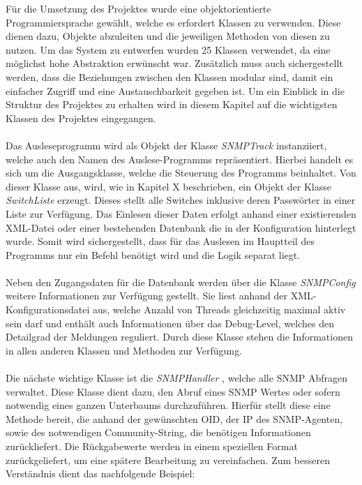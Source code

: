 Für die Umsetzung des Projektes wurde eine objektorientierte Programmiersprache gewählt, welche es erfordert Klassen zu verwenden.
Diese dienen dazu, Objekte abzuleiten und die jeweiligen Methoden von diesen zu nutzen.
Um das System zu entwerfen wurden 25 Klassen verwendet, da eine möglichst hohe Abstraktion erwünscht war.
Zusätzlich muss auch sichergestellt werden, dass die Beziehungen zwischen den Klassen modular sind, damit ein einfacher Zugriff und eine Austauschbarkeit gegeben ist.
Um ein Einblick in die Struktur des Projektes zu erhalten wird in diesem Kapitel auf die wichtigsten Klassen des Projektes eingegangen. \\\\
Das Ausleseprogramm wird als Objekt der Klasse \textit{SNMPTrack} instanziiert, welche auch den Namen des Auslese-Programms repräsentiert.
Hierbei handelt es sich um die Ausgangsklasse, welche die Steuerung des Programms beinhaltet. Von dieser Klasse aus, wird, wie in Kapitel X beschrieben, ein Objekt der Klasse \textit{SwitchListe} erzeugt.
Dieses stellt alle Switches inklusive deren Passwörter in einer Liste zur Verfügung.
Das Einlesen dieser Daten erfolgt anhand einer existierenden XML-Datei oder einer bestehenden Datenbank die in der Konfiguration hinterlegt wurde.
Somit wird sichergestellt, dass für das Auslesen im Hauptteil des Programms nur ein Befehl benötigt wird und die Logik separat liegt.\\\\
Neben den Zugangsdaten für die Datenbank werden über die Klasse \textit{SNMPConfig} weitere Informationen zur Verfügung gestellt.
Sie liest anhand der XML-Konfigurationsdatei aus, welche Anzahl von Threads gleichzeitig maximal aktiv sein darf und enthält auch Informationen über das Debug-Level, welches den Detailgrad der Meldungen reguliert.
Durch diese Klasse stehen die Informationen in allen anderen Klassen und Methoden zur Verfügung.\\\\
Die nächste wichtige Klasse ist die \textit{SNMPHandler} , welche alle SNMP Abfragen verwaltet.
Diese Klasse dient dazu, den Abruf eines SNMP Wertes oder sofern notwendig eines ganzen Unterbaums durchzuführen.
Hierfür stellt diese eine Methode bereit, die anhand der gewünschten OID, der IP des SNMP-Agenten, sowie des notwendigen Community-String, die benötigen Informationen  zurückliefert.
Die Rückgabewerte werden in einem speziellen Format zurückgeliefert, um eine spätere Bearbeitung zu vereinfachen. Zum besseren Verständnis dient das nachfolgende Beispiel:\\

